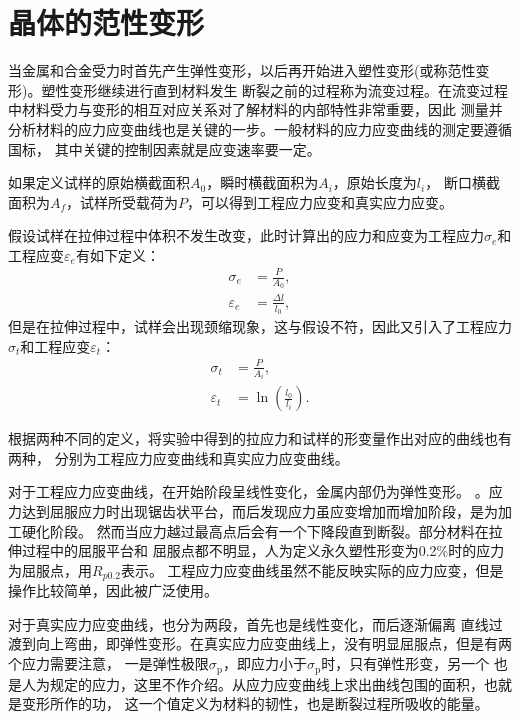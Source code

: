 \chapter{晶体的范性变形}
    当金属和合金受力时首先产生弹性变形，以后再开始进入塑性变形(或称范性变形)。塑性变形继续进行直到材料发生
    断裂之前的过程称为流变过程。在流变过程中材料受力与变形的相互对应关系对了解材料的内部特性非常重要，因此
    测量并分析材料的应力应变曲线也是关键的一步。一般材料的应力应变曲线的测定要遵循国标，
    其中关键的控制因素就是应变速率要一定。

    如果定义试样的原始横截面积$A_0$，瞬时横截面积为$A_i$，原始长度为$l_i$，
    断口横截面积为$A_f$，试样所受载荷为$P$，可以得到工程应力应变和真实应力应变。

    假设试样在拉伸过程中体积不发生改变，此时计算出的应力和应变为工程应力$\sigma_e$和工程应变$\varepsilon_e$有如下定义：
    \begin{align}
        \sigma_{e}&=\frac{P}{A_0},\\
        \varepsilon_{e}&=\frac{\Delta l}{l_0},
    \end{align}
    但是在拉伸过程中，试样会出现颈缩现象，这与假设不符，因此又引入了工程应力$\sigma_t$和工程应变$\varepsilon_t$：
    \begin{align}
        \sigma_{t}&=\frac{P}{A_i},\\
        \varepsilon_{t}&=\ln\left( \frac{l_0}{l_i} \right).
    \end{align}

    根据两种不同的定义，将实验中得到的拉应力和试样的形变量作出对应的曲线也有两种，
    分别为工程应力应变曲线和真实应力应变曲线。

    对于工程应力应变曲线，在开始阶段呈线性变化，金属内部仍为弹性变形。
    。应力达到屈服应力时出现锯齿状平台，而后发现应力虽应变增加而增加阶段，是为加工硬化阶段。
    然而当应力越过最高点后会有一个下降段直到断裂。部分材料在拉伸过程中的屈服平台和
    屈服点都不明显，人为定义永久塑性形变为0.2\%时的应力为屈服点，用$R_{p0.2}$表示。
    工程应力应变曲线虽然不能反映实际的应力应变，但是操作比较简单，因此被广泛使用。

    对于真实应力应变曲线，也分为两段，首先也是线性变化，而后逐渐偏离
    直线过渡到向上弯曲，即弹性变形。在真实应力应变曲线上，没有明显屈服点，但是有两个应力需要注意，
    一是弹性极限$\sigma_{\mathrm{p}}$，即应力小于$\sigma_{\mathrm{p}}$时，只有弹性形变，另一个
    也是人为规定的应力，这里不作介绍。从应力应变曲线上求出曲线包围的面积，也就是变形所作的功，
    这一个值定义为材料的韧性，也是断裂过程所吸收的能量。

